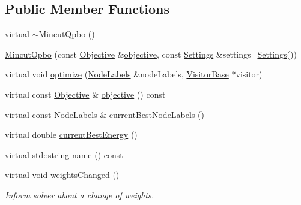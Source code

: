 \subsection*{Public Member Functions}
\begin{DoxyCompactItemize}
\item 
virtual \hyperlink{classnifty_1_1graph_1_1MincutQpbo_a5df716baff91fa5acc8bdc4ce2131147}{$\sim$\+Mincut\+Qpbo} ()
\item 
\hyperlink{classnifty_1_1graph_1_1MincutQpbo_ae076ab0de1daffd0beee3fdd3b1ed1d4}{Mincut\+Qpbo} (const \hyperlink{classnifty_1_1graph_1_1MincutQpbo_a1a2e13cc74cf8ec2bceeb80e73f8b002}{Objective} \&\hyperlink{classnifty_1_1graph_1_1MincutQpbo_ac5e23c8fcf1fa51f420344972994d2eb}{objective}, const \hyperlink{structnifty_1_1graph_1_1MincutQpbo_1_1Settings}{Settings} \&settings=\hyperlink{structnifty_1_1graph_1_1MincutQpbo_1_1Settings}{Settings}())
\item 
virtual void \hyperlink{classnifty_1_1graph_1_1MincutQpbo_a444fc49d1789a77bc0bc4a95e3d51a34}{optimize} (\hyperlink{classnifty_1_1graph_1_1MincutQpbo_a6c5fd1d59ebe854e4aafec08563cd91c}{Node\+Labels} \&node\+Labels, \hyperlink{classnifty_1_1graph_1_1MincutBase_a5ba378dc5a1fc073eb9449ca635e7648}{Visitor\+Base} $\ast$visitor)
\item 
virtual const \hyperlink{classnifty_1_1graph_1_1MincutQpbo_a1a2e13cc74cf8ec2bceeb80e73f8b002}{Objective} \& \hyperlink{classnifty_1_1graph_1_1MincutQpbo_ac5e23c8fcf1fa51f420344972994d2eb}{objective} () const 
\item 
virtual const \hyperlink{classnifty_1_1graph_1_1MincutQpbo_a6c5fd1d59ebe854e4aafec08563cd91c}{Node\+Labels} \& \hyperlink{classnifty_1_1graph_1_1MincutQpbo_a21f589ced387682ab61b485458927a80}{current\+Best\+Node\+Labels} ()
\item 
virtual double \hyperlink{classnifty_1_1graph_1_1MincutQpbo_aac480471bc55990e01a6e4fc28776d38}{current\+Best\+Energy} ()
\item 
virtual std\+::string \hyperlink{classnifty_1_1graph_1_1MincutQpbo_a070ed50a7b2881ea1945008f9f91a3a9}{name} () const 
\item 
virtual void \hyperlink{classnifty_1_1graph_1_1MincutQpbo_aa1518730e0999d0d12f1c76a7580f1c1}{weights\+Changed} ()
\begin{DoxyCompactList}\small\item\em Inform solver about a change of weights. \end{DoxyCompactList}\end{DoxyCompactItemize}


